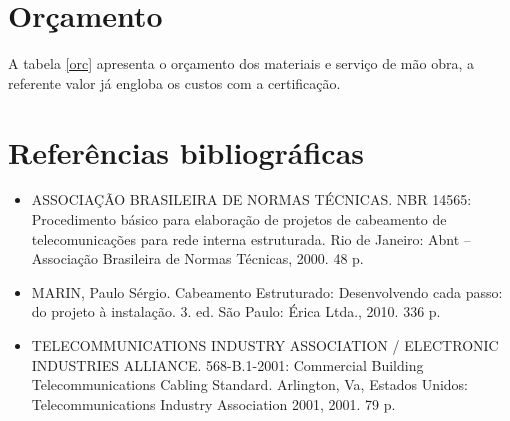 \documentclass[	DIV=calc,%
							paper=a4,%
							fontsize=12pt,%
							onecolumn]{scrartcl}	 					%
\begin{document}

\section{Orçamento}
A tabela \ref{orc} apresenta o orçamento dos materiais e serviço de mão obra, a referente valor já engloba os custos com a certificação.




\section{Referências bibliográficas}
\begin{itemize}
	\item ASSOCIAÇÃO BRASILEIRA DE NORMAS TÉCNICAS. NBR 14565: Procedimento básico para elaboração de projetos de cabeamento de telecomunicações para rede interna estruturada. Rio de Janeiro: Abnt – Associação Brasileira de Normas Técnicas, 2000. 48 p.
	
	\item MARIN, Paulo Sérgio. Cabeamento Estruturado: Desenvolvendo cada passo: do projeto à instalação. 3. ed. São Paulo: Érica Ltda., 2010. 336 p.
	
	\item TELECOMMUNICATIONS INDUSTRY ASSOCIATION / ELECTRONIC INDUSTRIES ALLIANCE. 568-B.1-2001: Commercial Building Telecommunications Cabling Standard. Arlington, Va, Estados Unidos: Telecommunications Industry Association 2001, 2001. 79 p.
	
\end{itemize}
\end{document}
